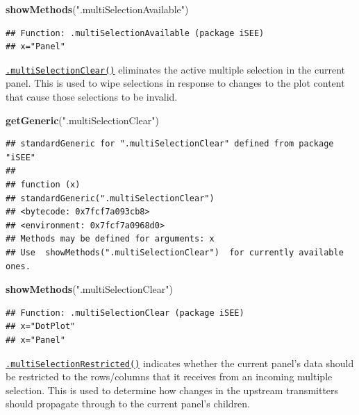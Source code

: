 \documentclass[
]{book}
\newenvironment{Shaded}{\begin{snugshade}}{\end{snugshade}}
\newcommand{\KeywordTok}[1]{\textcolor[rgb]{0.13,0.29,0.53}{\textbf{#1}}}
\newcommand{\NormalTok}[1]{#1}
\newcommand{\StringTok}[1]{\textcolor[rgb]{0.31,0.60,0.02}{#1}}
\begin{document}
\begin{Shaded}
\begin{Highlighting}[]
\KeywordTok{showMethods}\NormalTok{(}\StringTok{".multiSelectionAvailable"}\NormalTok{)}
\end{Highlighting}
\end{Shaded}

\begin{verbatim}
## Function: .multiSelectionAvailable (package iSEE)
## x="Panel"
\end{verbatim}

\href{https://isee.github.io/iSEE/reference/multi-select-generics.html}{\texttt{.multiSelectionClear()}} eliminates the active multiple selection in the current panel.
This is used to wipe selections in response to changes to the plot content that cause those selections to be invalid.

\begin{Shaded}
\begin{Highlighting}[]
\KeywordTok{getGeneric}\NormalTok{(}\StringTok{".multiSelectionClear"}\NormalTok{)}
\end{Highlighting}
\end{Shaded}

\begin{verbatim}
## standardGeneric for ".multiSelectionClear" defined from package "iSEE"
## 
## function (x) 
## standardGeneric(".multiSelectionClear")
## <bytecode: 0x7fcf7a093cb8>
## <environment: 0x7fcf7a0968d0>
## Methods may be defined for arguments: x
## Use  showMethods(".multiSelectionClear")  for currently available ones.
\end{verbatim}

\begin{Shaded}
\begin{Highlighting}[]
\KeywordTok{showMethods}\NormalTok{(}\StringTok{".multiSelectionClear"}\NormalTok{)}
\end{Highlighting}
\end{Shaded}

\begin{verbatim}
## Function: .multiSelectionClear (package iSEE)
## x="DotPlot"
## x="Panel"
\end{verbatim}

\href{https://isee.github.io/iSEE/reference/multi-select-generics.html}{\texttt{.multiSelectionRestricted()}} indicates whether the current panel's data should be restricted to the rows/columns that it receives from an incoming multiple selection.
This is used to determine how changes in the upstream transmitters should propagate through to the current panel's children.
\end{document}
